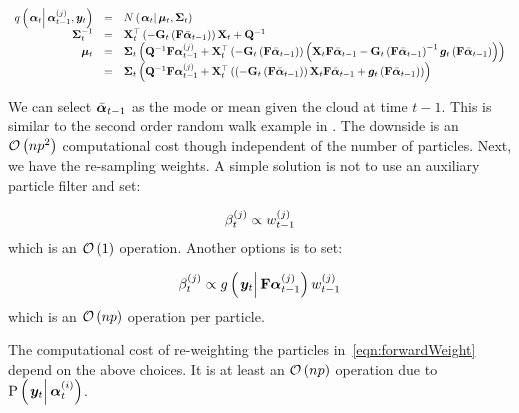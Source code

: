 \begin{equation}\begin{array}{rcl}
	\IDC{\vec{\alpha}_t}{\partic{\vec{\alpha}}{t-1}{j}, \vec{y}_t} &=&  %
		\normalC{\vec{\alpha}_t}{\vec{\mu}_t}{\mat{\Sigma}_t} \\
%
	\mat{\Sigma}_t^{-1} &=& \mat{X}_t^\top 
		\Lparen{-\mat{G}_t\Lparen{\mat{F}\vecb{\alpha}_{t - 1}}}
		\mat{X}_t + \mat{Q}^{-1}  \\
%
	\vec{\mu}_t &=& \mat{\Sigma}_t\Lparen{
		\mat{Q}^{-1}\mat{F}\partic{\vec{\alpha}}{t-1}{j} + 
		\mat{X}_t^\top \Lparen{-\mat{G}_t\Lparen{\mat{F}\vecb{\alpha}_{t - 1}}}
		\Lparen{
			\mat{X}_t\mat{F}\vecb{\alpha}_{t - 1} - 
			\mat{G}_t\Lparen{\mat{F}\vecb{\alpha}_{t - 1}}^{-1}
			\vec{g}_t\Lparen{\mat{F}\vecb{\alpha}_{t - 1}}
		}
	} \\
%
	 &=& \mat{\Sigma}_t\Lparen{
		\mat{Q}^{-1}\mat{F}\partic{\vec{\alpha}}{t-1}{j} + 
		\mat{X}_t^\top
		\Lparen{
			\Lparen{-\mat{G}_t\Lparen{\mat{F}\vecb{\alpha}_{t - 1}}}
			\mat{X}_t\mat{F}\vecb{\alpha}_{t - 1} +
			\vec{g}_t\Lparen{\mat{F}\vecb{\alpha}_{t - 1}}
		}
	}
\end{array}\end{equation}
%
%

We can select  $\bar{\bm{\alpha}}_{t - 1}$ as the mode or mean given the cloud at time $t-1$. This is similar to the second order random walk example in \cite{fearnhead10}. The downside is an $\mathcal{O}\left( np^2\right)$ computational cost though independent of the number of particles. Next, we have the re-sampling weights. A simple solution is not to use an auxiliary particle filter and set:

\begin{equation}
	\beta_{t}^{\left( j\right)} \propto w_{t-1}^{\left( j\right)}
\end{equation}
%
which is an $\mathcal{O}\left( 1\right)$ operation. Another options is to set:

\begin{equation}
	\partic{\beta}{t}{j} \propto  \optorC{g}{\vec{y}_t}{\mat{F}\partic{\vec{\alpha}}{t-1}{j}}\partic{w}{t-1}{j}
\end{equation}
%
%
which is an $\mathcal{O}\left( np\right)$ operation per particle.

The computational cost of re-weighting the particles in~\eqref{eqn:forwardWeight} depend on the above choices. It is at least an $\mathcal{O}\left( np\right)$ operation due to $\propC{\vec{y}_t}{\partic{\vec{\alpha}}{t}{i}}$.


